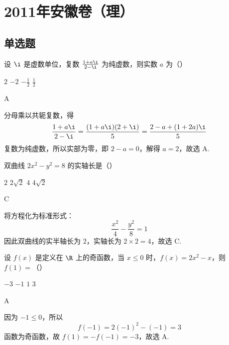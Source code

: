 \chapter{2011年安徽卷（理）}

\section{单选题}

\begin{problem}
设 \(\i\) 是虚数单位，复数 \(\frac{1 + a\i}{2 - \i}\) 为纯虚数，则实数 \(a\) 为（\quad）

\choices
    {\(2\)}
    {\(-2\)}
    {\(-\frac{1}{2}\)}
    {\(\frac{1}{2}\)}
\end{problem}

\begin{answer}
A
\end{answer}

\begin{solution}
分母乘以共轭复数，得
\[
\frac{1+a\i}{2-\i}=\frac{(1+a\i)(2+\i)}{5}=\frac{2-a+(1+2a)\i}{5}
\]
复数为纯虚数，所以实部为零，即 \(2-a=0\)，解得 \(a=2\)，故选 A.
\end{solution}

\begin{problem}
双曲线 \(2x^{2} - y^{2} = 8\) 的实轴长是（\quad）

\choices
    {\(2\)}
    {\(2\sqrt{2}\)}
    {\(4\)}
    {\(4\sqrt{2}\)}
\end{problem}

\begin{answer}
C
\end{answer}

\begin{solution}
将方程化为标准形式：
\[
\frac{x^{2}}{4}-\frac{y^{2}}{8}=1
\]
因此双曲线的实半轴长为 \(2\)，实轴长为 \(2\times2=4\)，故选 C.
\end{solution}

\begin{problem}
设 \( f(x) \) 是定义在 \( \R \) 上的奇函数，当 \( x \leqslant 0 \) 时，\( f(x) = 2x^2 - x \)，则 \( f(1) = \)（\quad）

\choices
    {\(-3\)}
    {\(-1\)}
    {\(1\)}
    {\(3\)}
\end{problem}

\begin{answer}
A
\end{answer}

\begin{solution}
因为 \(-1\leqslant0\)，所以
\[
f(-1)=2(-1)^2-(-1)=3
\]
函数为奇函数，故 \(f(1)=-f(-1)=-3\)，故选 A.
\end{solution}

